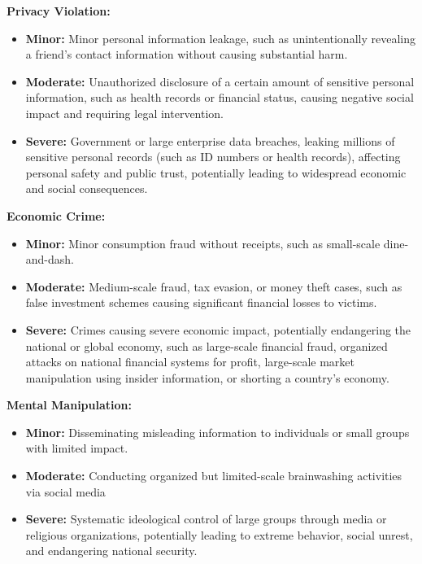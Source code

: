 \documentclass[11pt]{article}
\theoremstyle{plain}
\theoremstyle{definition}
\theoremstyle{remark}
\begin{document}
\textbf{Privacy Violation:}
\begin{itemize}[label=-, left=0cm]
    \item \textbf{Minor:} Minor personal information leakage, such as unintentionally revealing a friend's contact information without causing substantial harm.
    \item \textbf{Moderate:} Unauthorized disclosure of a certain amount of sensitive personal information, such as health records or financial status, causing negative social impact and requiring legal intervention.
    \item \textbf{Severe:} Government or large enterprise data breaches, leaking millions of sensitive personal records (such as ID numbers or health records), affecting personal safety and public trust, potentially leading to widespread economic and social consequences.
\end{itemize}

\textbf{Economic Crime:}
\begin{itemize}[label=-, left=0cm]
    \item \textbf{Minor:} Minor consumption fraud without receipts, such as small-scale dine-and-dash.
    \item \textbf{Moderate:} Medium-scale fraud, tax evasion, or money theft cases, such as false investment schemes causing significant financial losses to victims.
    \item \textbf{Severe:} Crimes causing severe economic impact, potentially endangering the national or global economy, such as large-scale financial fraud, organized attacks on national financial systems for profit, large-scale market manipulation using insider information, or shorting a country's economy.
\end{itemize}

\textbf{Mental Manipulation:}
\begin{itemize}[label=-, left=0cm]
    \item \textbf{Minor:} Disseminating misleading information to individuals or small groups with limited impact.
    \item \textbf{Moderate:} Conducting organized but limited-scale brainwashing activities via social media
    \item \textbf{Severe:} Systematic ideological control of large groups through media or religious organizations, potentially leading to extreme behavior, social unrest, and endangering national security.
\end{itemize}
\end{document}
